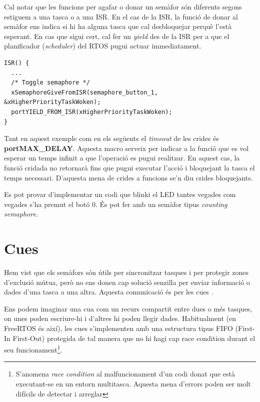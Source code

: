 Cal notar que les funcions per agafar o donar un semàfor són diferents segons estiguem a una tasca o a una \gls{ISR}. En el cas de la ISR, la funció de donar al semàfor ens indica si hi ha alguna tasca que cal desbloquejar perquè l'està esperant. En cas que sigui cert, cal fer un {\em yield} des de la \gls{ISR} per a que el planificador ({\em scheduler}) del RTOS pugui actuar immediatament.

\begin{lstlisting}[caption=ISR del botó 0,style=customc,label=ISR_semaphore]
ISR() {
  ...
  /* Toggle semaphore */
  xSemaphoreGiveFromISR(semaphore_button_1, &xHigherPriorityTaskWoken);
  portYIELD_FROM_ISR(xHigherPriorityTaskWoken);
}
\end{lstlisting}

Tant en aquest exemple com en els següents el {\em timeout} de les crides és {\bf portMAX\_DELAY}. Aquesta macro serveix per indicar a la funció que es vol esperar un temps infinit a que l'operació es pugui realitzar. En aquest cas, la funció cridada no retornarà fins que pugui executar l'acció i bloquejant la tasca el temps necessari. D'aquesta mena de crides a funcions se'n diu crides bloquejants.

\begin{exercise}
Es pot provar d'implementar un codi que blinki el LED tantes vegades com vegades s'ha premut el botó 0. És pot fer amb un semàfor tipus {\em counting semaphore}.
\end{exercise}


\section{Cues}
\label{sec:queue}
Hem vist que els semàfors són útils per sincronitzar tasques i per protegir zones d'exclusió mútua, però no ens donen cap solució senzilla per enviar informació o dades d'una tasca a una altra. Aquesta comunicació és per les cues \cite[102]{FreeRTOSBook}.

Ens podem imaginar una cua com un recurs compartit entre dues o més tasques, on unes poden escriure-hi i d'altres hi poden llegir dades. Habitualment (en FreeRTOS és així), les cues s'implementen amb una estructura tipus FIFO (First-In First-Out) protegida de tal manera que no hi hagi cap \gls{race condition} durant el seu funcionament\footnote{S'anomena {\em race condition} al malfuncionament d'un codi donat que està executant-se en un entorn multitasca. Aquesta mena d'errors poden ser molt difícils de detectar i arreglar}.

